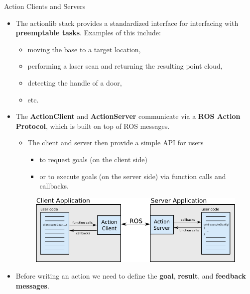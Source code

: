 \begin{frame}{Action Clients and Servers}
 \begin{itemize}
  \item The actionlib stack provides a standardized interface for interfacing with \textbf{preemptable tasks}. Examples of this include:
   \begin{itemize}
    \item moving the base to a target location, 
    \item performing a laser scan and returning the resulting point cloud, 
    \item detecting the handle of a door, 
    \item etc.
\end{itemize}     
  \item The \textbf{ActionClient} and \textbf{ActionServer} communicate via a \textbf{ROS Action Protocol}, which is built on top of ROS messages. 
   \begin{itemize}
    \item The client and server then provide a simple API for users
     \begin{itemize}
      \item to request goals (on the client side) 
      \item or to execute goals (on the server side) via function calls and callbacks.
     \end{itemize}         
   \end{itemize}       
   \begin{figure}
    \includegraphics[width=.7\textwidth]{./img/ros/actionlib.png}
   \end{figure}
  \item Before writing an action we need to define the \textbf{goal}, \textbf{result}, and \textbf{feedback messages}. 

  

\end{itemize}
\end{frame}
